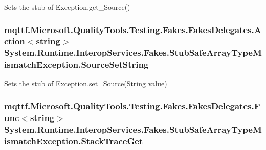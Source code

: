 Sets the stub of Exception.\-get\-\_\-\-Source()

\hypertarget{class_system_1_1_runtime_1_1_interop_services_1_1_fakes_1_1_stub_safe_array_type_mismatch_exception_a354ee21107ba1d7999054f0cc04405d0}{
\subsubsection[{Source\-Set\-String}]{\setlength{\rightskip}{0pt plus 5cm}mqttf.\-Microsoft.\-Quality\-Tools.\-Testing.\-Fakes.\-Fakes\-Delegates.\-Action$<$string$>$ System.\-Runtime.\-Interop\-Services.\-Fakes.\-Stub\-Safe\-Array\-Type\-Mismatch\-Exception.\-Source\-Set\-String}}\label{class_system_1_1_runtime_1_1_interop_services_1_1_fakes_1_1_stub_safe_array_type_mismatch_exception_a354ee21107ba1d7999054f0cc04405d0}


Sets the stub of Exception.\-set\-\_\-\-Source(\-String value)

\hypertarget{class_system_1_1_runtime_1_1_interop_services_1_1_fakes_1_1_stub_safe_array_type_mismatch_exception_ac61d62dde1b3371c0000f8e6f149186d}{
\subsubsection[{Stack\-Trace\-Get}]{\setlength{\rightskip}{0pt plus 5cm}mqttf.\-Microsoft.\-Quality\-Tools.\-Testing.\-Fakes.\-Fakes\-Delegates.\-Func$<$string$>$ System.\-Runtime.\-Interop\-Services.\-Fakes.\-Stub\-Safe\-Array\-Type\-Mismatch\-Exception.\-Stack\-Trace\-Get}}\label{class_system_1_1_runtime_1_1_interop_services_1_1_fakes_1_1_stub_safe_array_type_mismatch_exception_ac61d62dde1b3371c0000f8e6f149186d}


